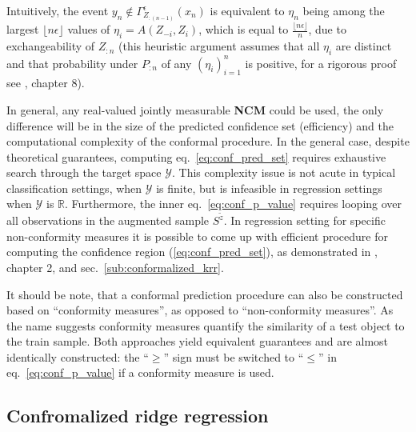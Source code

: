 \documentclass{ITaSconf}
\newcommand{\Ycal}{\mathcal{Y}}
\newcommand{\Real}{\mathbb{R}}
\begin{document}
Intuitively, the event $y_n \notin \Gamma^\epsilon_{Z_{:(n-1)}}(x_n)$ is equivalent
to $\eta_n$ being among the largest $\lfloor n\epsilon\rfloor$ values of $\eta_i = A(Z_{-i}, Z_i)$,
which is equal to $\frac{\lfloor n\epsilon\rfloor}{n}$, due to exchangeability of
$Z_{:n}$ (this heuristic argument assumes that all $\eta_i$ are distinct and that
probability under $P_{:n}$ of any $(\eta_i)_{i=1}^n$ is positive, for a rigorous
proof see \cite{vovk2005}, chapter 8).

In general, any real-valued jointly measurable \textbf{NCM} could be used, the only
difference will be in the size of the predicted confidence set (efficiency) and the
computational complexity of the conformal procedure. In the general case, despite
theoretical guarantees, computing eq.~\ref{eq:conf_pred_set} requires exhaustive
search through the target space $\Ycal$. This complexity issue is not acute in typical
classification settings, when $\Ycal$ is finite, but is infeasible in regression
settings when $\Ycal$ is $\Real$. Furthermore, the inner eq.~\ref{eq:conf_p_value}
requires looping over all observations in the augmented sample $S^{\tilde{z}}$.
In regression setting for specific non-conformity measures it is possible to come
up with efficient procedure for computing the confidence region (\ref{eq:conf_pred_set}),
as demonstrated in \cite{vovk2005}, chapter 2, and sec.~\ref{sub:conformalized_krr}.

It should be note, that a conformal prediction procedure can also be constructed
based on ``conformity measures'', as opposed to ``non-conformity measures''. As
the name suggests conformity measures quantify the similarity of a test object to
the train sample. Both approaches yield equivalent guarantees and are almost identically
constructed: the ``$\geq$'' sign must be switched to ``$\leq$'' in eq.~\ref{eq:conf_p_value}
if a conformity measure is used.


\subsection{Confromalized ridge regression} %
\label{sub:conformalized_ridge_regression}
\end{document}
